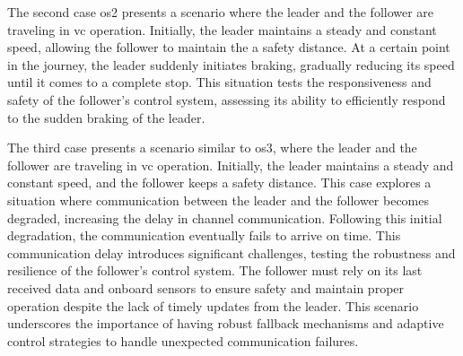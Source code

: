 \documentclass[letterpaper, 10 pt, conference]{ieeeconf}
\theoremstyle{definition}
\theoremstyle{nopoint}
\begin{document}
  The second case \gls{os}2  presents a scenario where the leader and the follower are traveling in \gls{vc} operation. Initially, the leader maintains a steady and constant speed, allowing the follower to maintain the a safety distance. At a certain point in the journey, the leader suddenly initiates braking, gradually reducing its speed until it comes to a complete stop. This situation tests the responsiveness and safety of the follower's control system, assessing its ability to efficiently respond to the sudden braking of the leader.
  
  The third case presents a scenario similar to \gls{os}3, where the leader and the follower are traveling in \gls{vc} operation. Initially, the leader maintains a steady and constant speed, and the follower keeps a safety distance. This case explores a situation where communication between the leader and the follower becomes degraded, increasing the delay in channel communication. Following this initial degradation, the communication eventually fails to arrive on time. This communication delay introduces significant challenges, testing the robustness and resilience of the follower's control system. The follower must rely on its last received data and onboard sensors to ensure safety and maintain proper operation despite the lack of timely updates from the leader. This scenario underscores the importance of having robust fallback mechanisms and adaptive control strategies to handle unexpected communication failures.
  

%							
%							
%							
%							
%							
%							
%							
%							
%							
%					
		
\end{document}
